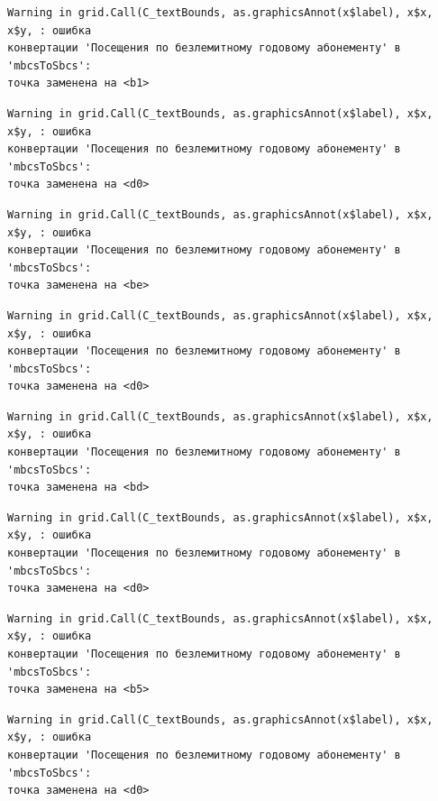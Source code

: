 \documentclass[
  letterpaper,
  DIV=11,
  numbers=noendperiod]{scrreprt}
\begin{document}
\begin{verbatim}
Warning in grid.Call(C_textBounds, as.graphicsAnnot(x$label), x$x, x$y, : ошибка
конвертации 'Посещения по безлемитному годовому абонементу' в 'mbcsToSbcs':
точка заменена на <b1>
\end{verbatim}

\begin{verbatim}
Warning in grid.Call(C_textBounds, as.graphicsAnnot(x$label), x$x, x$y, : ошибка
конвертации 'Посещения по безлемитному годовому абонементу' в 'mbcsToSbcs':
точка заменена на <d0>
\end{verbatim}

\begin{verbatim}
Warning in grid.Call(C_textBounds, as.graphicsAnnot(x$label), x$x, x$y, : ошибка
конвертации 'Посещения по безлемитному годовому абонементу' в 'mbcsToSbcs':
точка заменена на <be>
\end{verbatim}

\begin{verbatim}
Warning in grid.Call(C_textBounds, as.graphicsAnnot(x$label), x$x, x$y, : ошибка
конвертации 'Посещения по безлемитному годовому абонементу' в 'mbcsToSbcs':
точка заменена на <d0>
\end{verbatim}

\begin{verbatim}
Warning in grid.Call(C_textBounds, as.graphicsAnnot(x$label), x$x, x$y, : ошибка
конвертации 'Посещения по безлемитному годовому абонементу' в 'mbcsToSbcs':
точка заменена на <bd>
\end{verbatim}

\begin{verbatim}
Warning in grid.Call(C_textBounds, as.graphicsAnnot(x$label), x$x, x$y, : ошибка
конвертации 'Посещения по безлемитному годовому абонементу' в 'mbcsToSbcs':
точка заменена на <d0>
\end{verbatim}

\begin{verbatim}
Warning in grid.Call(C_textBounds, as.graphicsAnnot(x$label), x$x, x$y, : ошибка
конвертации 'Посещения по безлемитному годовому абонементу' в 'mbcsToSbcs':
точка заменена на <b5>
\end{verbatim}

\begin{verbatim}
Warning in grid.Call(C_textBounds, as.graphicsAnnot(x$label), x$x, x$y, : ошибка
конвертации 'Посещения по безлемитному годовому абонементу' в 'mbcsToSbcs':
точка заменена на <d0>
\end{verbatim}
\end{document}

